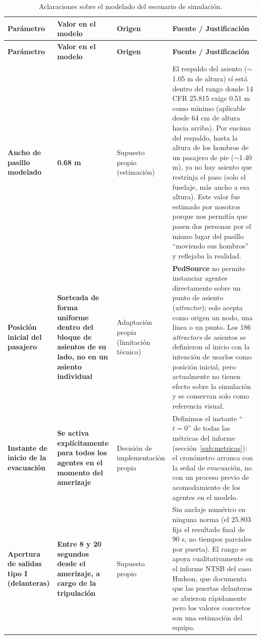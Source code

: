 \documentclass[a4paper, 11pt]{article}
\begin{document}
{\small
\begin{longtable}{L{2.6cm}L{3.2cm}L{2.2cm}L{5.7cm}}
\caption{Aclaraciones sobre el modelado del escenario de simulaci\'on.}\label{tab:aclaraciones}\\
\toprule
\textbf{Par\'ametro} & \textbf{Valor en el modelo} & \textbf{Origen} & \textbf{Fuente / Justificaci\'on} \\
\midrule
\endfirsthead
\toprule
\textbf{Par\'ametro} & \textbf{Valor en el modelo} & \textbf{Origen} & \textbf{Fuente / Justificaci\'on} \\
\midrule
\endhead
\bottomrule
\endfoot
\textbf{Ancho de pasillo modelado} & \textbf{0.68 m} & Supuesto propio (estimaci\'on) & El respaldo del asiento ($\sim$1.05 m de altura) s\'i est\'a dentro del rango donde 14 CFR 25.815 exige 0.51 m como m\'inimo (aplicable desde 64 cm de altura hacia arriba). Por encima del respaldo, hasta la altura de los hombros de un pasajero de pie ($\sim$1.40 m), ya no hay asiento que restrinja el paso (solo el fuselaje, m\'as ancho a esa altura). Este valor fue estimado por nosotros porque nos permit\'ia que pasen dos personas por el mismo lugar del pasillo ``moviendo sus hombros'' y reflejaba la realidad. \\
\midrule
\textbf{Posici\'on inicial del pasajero} & \textbf{Sorteada de forma uniforme dentro del bloque de asientos de su lado, no en un asiento individual} & Adaptaci\'on propia (limitaci\'on t\'ecnica) & \textbf{PedSource} no permite instanciar agentes directamente sobre un punto de asiento (\textit{attractor}); solo acepta como origen un nodo, una l\'inea o un punto. Los 186 \textit{attractors} de asientos se definieron al inicio con la intenci\'on de usarlos como posici\'on inicial, pero actualmente no tienen efecto sobre la simulaci\'on y se conservan solo como referencia visual. \\
\midrule
\textbf{Instante de inicio de la evacuaci\'on} & \textbf{Se activa expl\'icitamente para todos los agentes en el momento del amerizaje} & Decisi\'on de implementaci\'on propia & Definimos el instante ``$t=0$'' de todas las m\'etricas del informe (secci\'on~\ref{sub:metricas}): el cron\'ometro arranca con la se\~nal de evacuaci\'on, no con un proceso previo de acomodamiento de los agentes en el modelo. \\
\midrule
\textbf{Apertura de salidas tipo I (delanteras)} & \textbf{Entre 8 y 20 segundos desde el amerizaje, a cargo de la tripulaci\'on} & Supuesto propio & Sin anclaje num\'erico en ninguna norma (el 25.803 fija el resultado final de 90 s, no tiempos parciales por puerta). El rango se apoya cualitativamente en el informe NTSB del caso Hudson, que documenta que las puertas delanteras se abrieron r\'apidamente pero los valores concretos son una estimaci\'on del equipo. \\

\end{longtable}}
\end{document}
